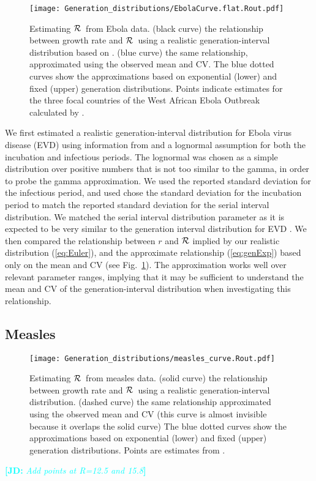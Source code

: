 \documentclass[12pt,]{article}
\newcommand{\RR}{\ensuremath{{\cal R}}}
\newcommand{\eref}[1]{(\ref{eq:#1})}
\newcommand{\fref}[1]{Fig.~\ref{fig:#1}}
\newcommand{\comment}[3]{\textcolor{#1}{\textbf{[#2: }\textit{#3}\textbf{]}}}
\newcommand{\jd}[1]{\comment{cyan}{JD}{#1}}
\begin{document}
\begin{figure}[htbp] \centering
	\texttt{[image: Generation\_distributions/EbolaCurve.flat.Rout.pdf]}
	\caption{Estimating \RR~from Ebola data.
(black curve) the relationship between growth rate and \RR~using a realistic generation-interval distribution based on \cite{WHO14}.
(blue curve) the same relationship, approximated using the observed mean and CV. 
The blue dotted curves show the approximations based on exponential (lower) and fixed (upper) generation distributions.
Points indicate estimates for the three focal countries of the West African Ebola Outbreak calculated by \cite{WHO14}.
	\label{fig:EbolaCurve}}
\end{figure}

We first estimated a realistic generation-interval distribution for Ebola virus disease (EVD) using information from \cite{WHO14} and a lognormal assumption for both the incubation and infectious periods.
The lognormal was chosen as a simple distribution over positive numbers that is not too similar to the gamma, in order to probe the gamma approximation.
We used the reported standard deviation for the infectious period, and used chose the standard deviation for the incubation period to match the reported standard deviation for the serial interval distribution.
We matched the serial interval distribution parameter as it is expected to be very similar to the generation interval distribution for EVD \cite{WHO14}.
We  then compared the relationship between $r$ and $\RR$ implied by our realistic distribution \eref{Euler}, and the approximate relationship \eref{genExp} based only on the mean and CV (see \fref{EbolaCurve}). The approximation works well over relevant parameter ranges, implying that it may be sufficient to understand the mean and CV of the generation-interval distribution when investigating this relationship.

\subsection{Measles}

\begin{figure}[htbp] \centering
	\texttt{[image: Generation\_distributions/measles\_curve.Rout.pdf]}
	\caption{Estimating \RR~from measles data.
		(solid curve) the relationship between growth rate and \RR~using a realistic generation-interval distribution.
		(dashed curve) the same relationship approximated using the observed mean and CV (this curve is almost invisible because it overlaps the solid curve)
		The blue dotted curves show the approximations based on exponential (lower) and fixed (upper) generation distributions.
		Points are estimates from \cite{AndeMay82}.
	}
	\label{fig:measlesCurve}
\end{figure}
\jd{Add points at R=12.5 and 15.8}
\end{document}
